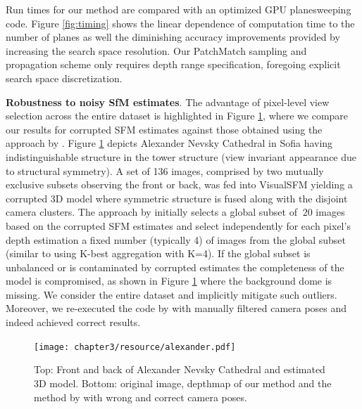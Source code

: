 Run times for our method are compared with an optimized GPU planesweeping code.
Figure \ref{fig:timing} shows the linear dependence of computation time to the number of planes as well the diminishing accuracy improvements provided by increasing the search space resolution. Our PatchMatch sampling and propagation scheme only requires depth range specification, foregoing  explicit search space discretization.



{\bf Robustness to noisy SfM estimates}. The  advantage of  pixel-level view selection across the entire dataset is highlighted  in Figure \ref{fig:alexander}, where we compare  our results for corrupted SFM estimates  against those obtained using the approach by \citet{Goesele07}.
Figure \ref{fig:alexander} depicts Alexander Nevsky Cathedral in Sofia having indistinguishable structure in the tower structure (\ie view invariant appearance due to structural symmetry). A set of 136 images, comprised by two mutually exclusive subsets observing the front or back, was fed into VisualSFM \cite{WuVSFM} yielding a corrupted 3D model where symmetric structure is fused along with the disjoint camera clusters. The approach by \citet{Goesele07} initially selects a global subset of $~20$ images based  on the corrupted SFM estimates and select  independently for each pixel's depth estimation a fixed number (typically 4) of images from the global subset (similar to using K-best aggregation with K=4). If the global subset is unbalanced or is contaminated by corrupted estimates the completeness of the model is compromised, as shown in Figure \ref{fig:alexander} where the background dome is missing. We consider the entire dataset and implicitly mitigate such outliers. Moreover, we re-executed the code by \citet{Goesele07} with manually filtered camera poses and indeed achieved correct results.

\begin{figure}[]
\centering
\texttt{[image: chapter3/resource/alexander.pdf]}
\caption{\label{fig:alexander} Top: Front and back of Alexander Nevsky Cathedral and estimated 3D model. Bottom: original image, depthmap of our method and the method by \citet{Goesele07} with wrong and correct camera poses.
}
\end{figure}

